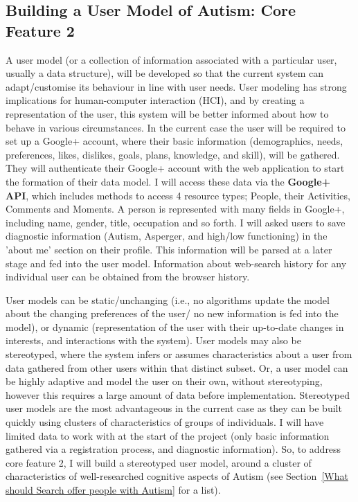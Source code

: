 \documentclass[a4paper, 10pt]{article}
\begin{document}
\subsection {Building a User Model of Autism: Core Feature 2}\label{usermodel}
A user model (or a collection of information associated with a particular user, usually a data structure), will be developed so that the current system can adapt/customise its behaviour in line with user needs. User modeling has strong implications for human-computer interaction (HCI), and by creating a representation of the user, this system will be better informed about how to behave in various circumstances. In the current case the user will be required to set up a Google+ account, where their basic information (demographics, needs, preferences, likes, dislikes, goals, plans, knowledge, and skill), will be gathered. They will authenticate their Google+ account with the web application to start the formation of their data model. I will access these data via the \textbf{Google+ API}, which includes methods to access 4 resource  types; People, their Activities, Comments and Moments. A person is represented with many fields in Google+, including name, gender, title, occupation and so forth. I will asked users to save diagnostic information (Autism, Asperger, and high/low functioning) in the 'about me' section on their profile. This information will be parsed at a later stage and fed into the user model. Information about web-search history for any individual user can be obtained from the browser history. 

User models can be static/unchanging (i.e., no algorithms update the model about the changing preferences of the user/ no new information is fed into the model), or dynamic (representation of the user with their up-to-date changes in interests, and interactions with the system). User models may also be stereotyped, where the system infers or assumes characteristics about a user from data gathered from other users within that distinct subset. Or, a user model can be highly adaptive and model the user on their own, without stereotyping, however this requires a large amount of data before implementation. Stereotyped user models are the most advantageous in the current case as they can be built quickly using clusters of characteristics of groups of individuals. I will have limited data to work with at the start of the project (only basic information gathered via a registration process, and diagnostic information). So, to address core feature 2, I will build a stereotyped user model, around a cluster of characteristics of well-researched cognitive aspects of Autism (see Section~\ref{What should Search offer people with Autism} for a list).
\end{document}
